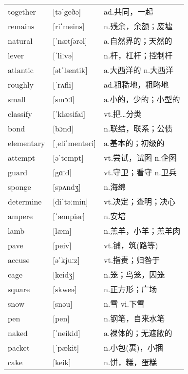 \documentclass[a4paper]{article}
\begin{document}
\section{}
\begin{tabular}{l l l}

together & [təˈgeðə] & ad.共同，一起 \\
remains & [riˈmeins] & n.残余，余额；废墟 \\
natural & [ˈnæt∫ərəl] & a.自然界的；天然的 \\
lever & [ˈliːvə] & n.杆，杠杆；控制杆 \\
atlantic & [ətˈlæntik] & a.大西洋的 n.大西洋 \\
roughly & [ˈrʌfli] & ad.粗糙地，粗略地 \\
small & [smɔːl] & a.小的，少的；小型的 \\
classify & [ˈklæsifai] & vt.把…分类 \\
bond & [bɔnd] & n.联结，联系；公债 \\
elementary & [ˌeliˈmentəri] & a.基本的；初级的 \\
attempt & [əˈtempt] & vt.尝试，试图 n.企图 \\
guard & [gɑːd] & vt.守卫；看守 n.卫兵 \\
sponge & [spʌndʒ] & n.海绵 \\
determine & [diˈtəːmin] & vt.决定；查明；决心 \\
ampere & [ˈæmpiər] & n.安培 \\
lamb & [læm] & n.羔羊，小羊；羔羊肉 \\
pave & [peiv] & vt.铺，筑(路等) \\
accuse & [əˈkjuːz] & vt.指责；归咎于 \\
cage & [keidʒ] & n.笼；鸟笼，囚笼 \\
square & [skweə] & n.正方形；广场 \\
snow & [snəu] & n.雪 vi.下雪 \\
pen & [pen] & n.钢笔，自来水笔 \\
naked & [ˈneikid] & a.裸体的；无遮敝的 \\
packet & [ˈpækit] & n.小包(裹)，小捆 \\
cake & [keik] & n.饼，糕，蛋糕 \\

\end{tabular}
\end{document}
